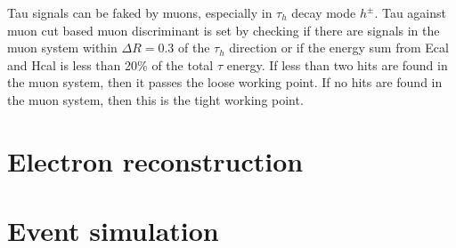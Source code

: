 Tau signals can be faked by muons, especially in $\tau_{h}$ decay mode $h^{\pm}$. Tau against muon cut based muon discriminant is set by checking if there are signals in the muon system within $\Delta R=0.3$ of the $\tau_{h}$ direction or if the energy sum from Ecal and Hcal is less than 20$\%$ of the total $\tau$ energy. If less than two hits are found in the muon system, then it passes the loose working point. If no hits are found in the muon system, then this is the tight working point. 


\section{Electron reconstruction}

\section{Event simulation}

